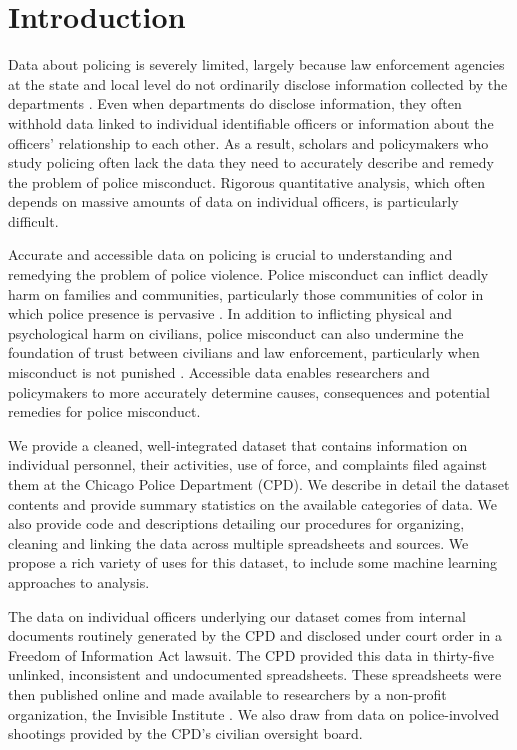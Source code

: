 

\section{Introduction} \label{sec:intro}

Data about policing is severely limited, largely because law enforcement
agencies at the state and local level do not ordinarily disclose information
collected by the departments \cite{Jackman21}. Even when departments do disclose
information, they often withhold data linked to individual identifiable
officers or information about the officers’ relationship to each other. As
a result, scholars and policymakers who study policing often lack the data they
need to accurately describe and remedy the problem of police misconduct.
Rigorous quantitative analysis, which often depends on massive amounts of data
on individual officers, is particularly difficult.

Accurate and accessible data on policing is crucial to understanding and
remedying the problem of police violence. Police misconduct can inflict deadly
harm on families and communities, particularly those communities of color in
which police presence is pervasive \cite{Alang17}. In addition to inflicting physical and
psychological harm on civilians, police misconduct can also undermine the
foundation of trust between civilians and law enforcement, particularly when
misconduct is not punished \cite{Desmond16}. Accessible data enables researchers and
policymakers to more accurately determine causes, consequences and potential
remedies for police misconduct.

We provide a cleaned, well-integrated dataset that contains information on
individual personnel, their activities, use of force, and complaints filed
against them at the Chicago Police Department (CPD). We describe in detail the
dataset contents and provide summary statistics on the available categories of
data. We also provide code and descriptions detailing our procedures for
organizing, cleaning and linking the data across multiple spreadsheets and
sources. We propose a rich variety of uses for this dataset, to include some
machine learning approaches to analysis.

The data on individual officers underlying our dataset comes from internal
documents routinely generated by the CPD and disclosed under court order in
a Freedom of Information Act lawsuit. The CPD provided this data in thirty-five
unlinked, inconsistent and undocumented spreadsheets. These spreadsheets were
then published online and made available to researchers by a non-profit
organization, the Invisible Institute \cite{Kaneya14}. We also draw from data on
police-involved shootings provided by the CPD’s civilian oversight board.

